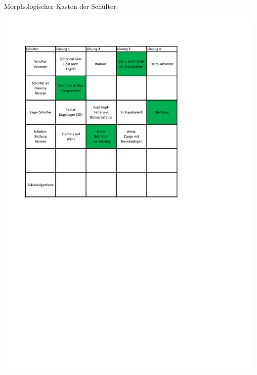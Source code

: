 	\begin{table}[h]
		\caption[Morphologischer Kasten der Schulter]{Morphologischer Kasten der Schulter.}
		\centering
		\includegraphics[width=\textwidth]{"Abb/Morphologischer Kasten Schulter"}
		\label{fig:morphologische-kasten-schulter}
	\end{table}


